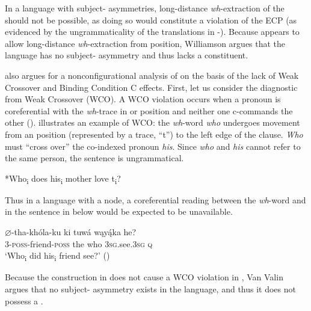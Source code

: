 \documentclass[output=paper]{LSP/langsci}
\begin{document}
In a language with subject- asymmetries, long-distance \textit{wh}-extraction of the  should not be possible, as doing so would constitute a violation of the ECP (as evidenced by the ungrammaticality of the  translations in -).  Because  appears to allow long-distance \textit{wh}-extraction from  position, Williamson argues that the language has no subject- asymmetry and thus lacks a  constituent.

\citet{VanValin1985,VanValin1987} also argues for a nonconfigurational analysis of  on the basis of the lack of Weak Crossover and Binding Condition C effects.  First, let us consider the diagnostic from Weak Crossover (WCO). A WCO violation occurs when a pronoun is coreferential with the \textit{wh}-trace in  or  position and neither one c-commands the other (\citealt{Sportiche1985}).   illustrates an  example of WCO: the \textit{wh}-word \textit{who} undergoes movement from an  position (represented by a trace, ``t'') to the left edge of the clause. \textit{Who} must ``cross over'' the co-indexed pronoun \textit{his}. Since \textit{who} and \textit{his} cannot refer to the same person, the sentence is ungrammatical. 

\begin{exe}
\ex\label{ex:jrs:9}  *Who\textsubscript{i} does his\textsubscript{i} mother love t\textsubscript{i}?
\end{exe}

Thus in a language with a  node, a coreferential reading between the \textit{wh}-word and  in the sentence in  below would be expected to be unavailable.

\begin{exe}
\ex\label{ex:jrs:10} \gll $\varnothing$-tha-kh\'ola-ku 	ki	tuw\'a	wąy\k{\'a}ka	he? \\
3-\textsc{poss}-friend-\textsc{poss} the who		\textsc{3sg}.see.\textsc{3sg} 	\textsc{q} \\
\trans `Who\textsubscript{i} did his\textsubscript{i}  friend see?' (\citealt[379]{VanValin1987})
\end{exe}

Because the construction in  does not cause a WCO violation in , Van Valin argues that no subject- asymmetry exists in the language, and thus it does not possess a .
	
\end{document}
